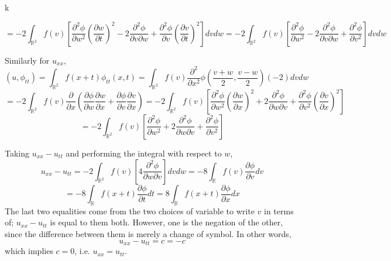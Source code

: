k\documentclass{article}
\begin{document}
\[=-2\int_{\mathbb{R}^2}f(v)\left[ \frac{\partial^2\phi}{\partial w^2}\left( \frac{\partial w}{\partial t} \right)^2-2\frac{\partial^2\phi}{\partial v\partial w}+\frac{\partial^2\phi}{\partial v}\left( \frac{\partial v}{\partial t} \right)^2 \right]dvdw=-2\int_{\mathbb{R}^2}f(v)\left[ \frac{\partial^2\phi}{\partial w^2}-2\frac{\partial^2\phi}{\partial v\partial w}+\frac{\partial^2\phi}{\partial v^2} \right]dvdw\]

Similarly for $u_{xx}$,
\[(u,\phi_{tt})=\int_{\mathbb{R}^2}f(x+t)\phi_{tt}(x,t)=\int_{\mathbb{R}^2}f(v)\frac{\partial^2}{\partial x^2}\phi\left(\frac{v+w}{2},\frac{v-w}{2}\right)(-2)dvdw\]
\[=-2\int_{\mathbb{R}^2}f(v)\frac{\partial}{\partial x}\left(\frac{\partial \phi}{\partial w}\frac{\partial w}{\partial x}+\frac{\partial \phi}{\partial v}\frac{\partial v}{\partial x}  \right)=-2\int_{\mathbb{R}^2}f(v)\left[ \frac{\partial^2\phi}{\partial w^2}\left( \frac{\partial w}{\partial x} \right)^2+2\frac{\partial^2\phi}{\partial w\partial v}+\frac{\partial^2 \phi}{\partial v^2}\left( \frac{\partial v}{\partial x} \right)^2 \right]\]
\[=-2\int_{\mathbb{R}^2}f(v)\left[  \frac{\partial^2\phi}{\partial w^2}+2\frac{\partial^2\phi}{\partial w\partial v}+\frac{\partial^2\phi}{\partial v^2}\right]\]

Taking $u_{xx}-u_{tt}$ and performing the integral with respect to $w$,
\[u_{xx}-u_{tt}=-2\int_{\mathbb{R}^2}f(v)\left[4\frac{\partial^2\phi}{\partial w\partial v}\right]dvdw=-8\int_{\mathbb{R}}f(v)\frac{\partial\phi}{\partial v}dv\]
\[=-8\int_\mathbb{R}f(x+t)\frac{\partial \phi}{\partial t}dt=8\int_\mathbb{R}f(x+t)\frac{\partial \phi}{\partial x}dx\]
The last two equalities come from the two choices of variable to write $v$ in terms of; $u_{xx}-u_{tt}$ is equal to them both. However, one is the negation of the other, since the difference between them is merely a change of symbol. In other words,
\[u_{xx}-u_{tt}=c=-c\]
which implies $c=0$, i.e. $u_{xx}=u_{tt}$.
\end{document}
